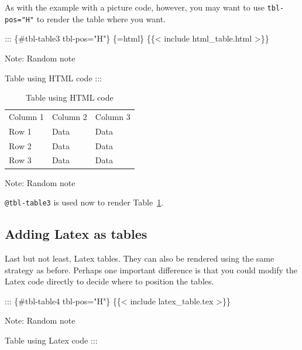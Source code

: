 \documentclass[
  11pts,
]{article}
\newenvironment{Shaded}{\begin{snugshade}}{\end{snugshade}}
\newcommand{\InformationTok}[1]{\textcolor[rgb]{0.37,0.37,0.37}{#1}}
\newcommand{\NormalTok}[1]{\textcolor[rgb]{0.00,0.23,0.31}{#1}}
\begin{document}
As with the example with a picture code, however, you may want to use
\texttt{tbl-pos="H"} to render the table where you want.

\begin{Shaded}
\begin{Highlighting}[]
\NormalTok{::: \{\#tbl{-}table3 tbl{-}pos="H"\}}
\InformationTok{\textasciigrave{}\textasciigrave{}\textasciigrave{}\{=html\}}
\InformationTok{\{\{\textless{} include html\_table.html \textgreater{}\}\}}
\InformationTok{\textasciigrave{}\textasciigrave{}\textasciigrave{}}

\NormalTok{Note: Random note}

\NormalTok{Table using HTML code  }
\NormalTok{:::}
\end{Highlighting}
\end{Shaded}

\begin{longtable}[]{@{}lll@{}}

\caption{\label{tbl-table3}Table using HTML code}

\tabularnewline

\toprule\noalign{}
\endhead
\bottomrule\noalign{}
\endlastfoot
Column 1 & Column 2 & Column 3 \\
Row 1 & Data & Data \\
Row 2 & Data & Data \\
Row 3 & Data & Data \\

\end{longtable}

Note: Random note

\texttt{@tbl-table3} is used now to render Table~\ref{tbl-table3}.

\subsection{Adding Latex as tables}\label{adding-latex-as-tables}

Last but not least, Latex tables. They can also be rendered using the
same strategy as before. Perhaps one important difference is that you
could modify the Latex code directly to decide where to position the
tables.

\begin{Shaded}
\begin{Highlighting}[]
\NormalTok{::: \{\#tbl{-}table4 tbl{-}pos="H"\}}
\NormalTok{\{\{\textless{} include latex\_table.tex \textgreater{}\}\} }

\NormalTok{Note: Random note}

\NormalTok{Table using Latex code}
\NormalTok{:::}
\end{Highlighting}
\end{Shaded}
\end{document}
